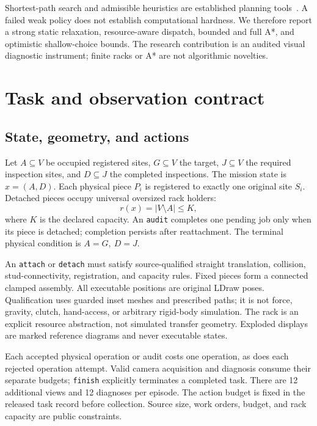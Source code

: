 \documentclass[10pt,twocolumn,letterpaper]{article}
\begin{document}
Shortest-path search and admissible heuristics are established planning
tools~\cite{astar}. A failed weak policy does not establish computational
hardness. We therefore report a strong static relaxation, resource-aware
dispatch, bounded and full A*, and optimistic shallow-choice bounds.
The research contribution is an audited visual diagnostic instrument;
finite racks or A* are not algorithmic novelties.

\section{Task and observation contract}
\subsection{State, geometry, and actions}
Let $A\subseteq V$ be occupied registered sites, $G\subseteq V$ the
target, $J\subseteq V$ the required inspection sites, and $D\subseteq J$
the completed inspections. The mission state is $x=(A,D)$.
Each physical piece $P_i$ is registered to exactly one original site
$S_i$. Detached pieces occupy universal oversized rack holders:
\begin{equation}
  r(x)=|V\setminus A|\leq K,
\end{equation}
where $K$ is the declared capacity. An \texttt{audit} completes one
pending job only when its piece is detached; completion persists after
reattachment. The terminal physical condition is $A=G,\ D=J$.

An \texttt{attach} or \texttt{detach} must satisfy source-qualified
straight translation, collision, stud-connectivity, registration, and
capacity rules. Fixed pieces form a connected clamped assembly.
All executable positions are original LDraw poses. Qualification uses
guarded inset meshes and prescribed paths; it is not force, gravity,
clutch, hand-access, or arbitrary rigid-body simulation.
The rack is an explicit resource abstraction, not simulated transfer
geometry. Exploded displays are marked reference diagrams and never
executable states.

Each accepted physical operation or audit costs one operation, as does
each rejected operation attempt. Valid camera acquisition and diagnosis
consume their separate budgets; \texttt{finish} explicitly terminates a
completed task. There are 12 additional views and 12 diagnoses per episode.
The action budget is fixed in the released task record before collection.
Source size, work orders, budget, and rack capacity are public constraints.
\end{document}
